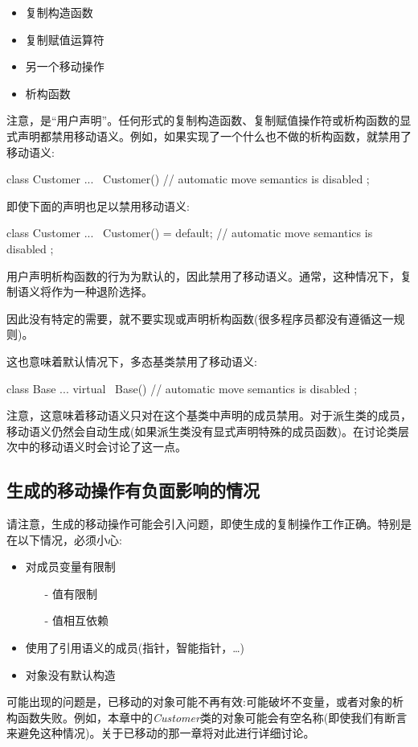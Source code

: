 \begin{itemize}
	\item 复制构造函数
	\item 复制赋值运算符
	\item 另一个移动操作
	\item 析构函数
\end{itemize}

注意，是“用户声明”。任何形式的复制构造函数、复制赋值操作符或析构函数的显式声明都禁用移动语义。例如，如果实现了一个什么也不做的析构函数，就禁用了移动语义:

\begin{cppcode}
class Customer {
	...
	~Customer() { // automatic move semantics is disabled
	}
};
\end{cppcode}

即使下面的声明也足以禁用移动语义:

\begin{cppcode}
class Customer {
	...
	~Customer() = default; // automatic move semantics is disabled
};
\end{cppcode}

用户声明析构函数的行为为默认的，因此禁用了移动语义。通常，这种情况下，复制语义将作为一种退阶选择。

因此没有特定的需要，就不要实现或声明析构函数(很多程序员都没有遵循这一规则)。

这也意味着默认情况下，多态基类禁用了移动语义:

\begin{cppcode}
class Base {
	...
	virtual ~Base() { // automatic move semantics is disabled
	}
};
\end{cppcode}

注意，这意味着移动语义只对在这个基类中声明的成员禁用。对于派生类的成员，移动语义仍然会自动生成(如果派生类没有显式声明特殊的成员函数)。在讨论类层次中的移动语义时会讨论了这一点。

\subsection{生成的移动操作有负面影响的情况}

请注意，生成的移动操作可能会引入问题，即使生成的复制操作工作正确。特别是在以下情况，必须小心:

\begin{itemize}
	\item 对成员变量有限制
	\begin{itemize}
		\item[-] 值有限制
		\item[-] 值相互依赖
	\end{itemize}
	\item 使用了引用语义的成员(指针，智能指针，…)
	\item 对象没有默认构造
\end{itemize}

可能出现的问题是，已移动的对象可能不再有效:可能破坏不变量，或者对象的析构函数失败。例如，本章中的\textit{Customer}类的对象可能会有空名称(即使我们有断言来避免这种情况)。关于已移动的那一章将对此进行详细讨论。











